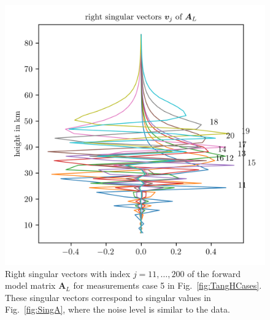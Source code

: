 \begin{figure}[ht!]
	\centering
	\includegraphics{MiddleVecA.png}
	\caption[Right singular vectors 11 to 19 of forward model.]{Right singular vectors with index $j = 11,\dots, 200$ of the forward model matrix $\bm{A}_L$ for measurements case 5 in Fig.~\ref{fig:TangHCases}.
		These singular vectors correspond to singular values in Fig.~\ref{fig:SingA}, where the noise level is similar to the data.}
	\label{fig:middleSpace}
\end{figure}
